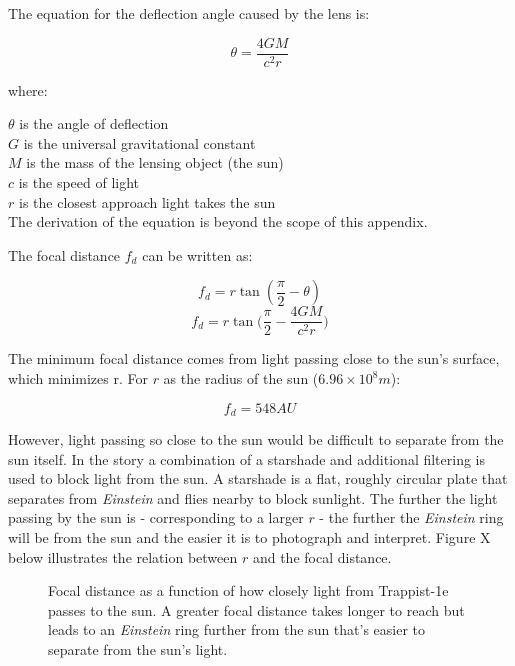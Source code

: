 \documentclass[12pt]{article} %
\begin{document}
The equation for the deflection angle caused by the lens is:

$$\theta = \frac{4GM}{c^2r}$$

where:

$\theta$ is the angle of deflection\\
$G$ is the universal gravitational constant\\
$M$ is the mass of the lensing object (the sun)\\
$c$ is the speed of light\\
$r$ is the closest approach light takes the sun\\

The derivation of the equation is beyond the scope of this appendix.

The focal distance $f_d$ can be written as:

$$f_d = r\tan (\frac{\pi}{2} - \theta)$$
$$f_d = r\tan\bigg(\frac{\pi}{2} - \frac{4GM}{c^2r}\bigg)$$

The minimum focal distance comes from light passing close to the sun's surface, which minimizes r. For $r$ as the radius of the sun ($6.96 \times 10^8 m$):

$$f_d =  548AU$$

However, light passing so close to the sun would be difficult to separate from the sun itself. In the story a combination of a starshade and additional filtering is used to block light from the sun. A starshade is a flat, roughly circular plate that separates from \textit{Einstein} and flies nearby to block sunlight. The further the light passing by the sun is - corresponding to a larger $r$ - the further the \textit{Einstein} ring will be from the sun and the easier it is to photograph and interpret. Figure X below illustrates the relation between $r$ and the focal distance. 

\begin{figure}[H]
	\caption{Focal distance as a function of how closely light from Trappist-1e passes to the sun. A greater focal distance takes longer to reach but leads to an \textit{Einstein} ring further from the sun that's easier to separate from the sun's light.}
\end{figure}
\end{document}
